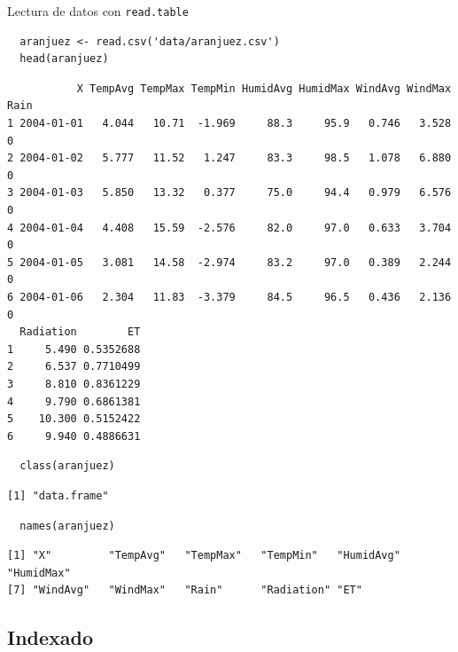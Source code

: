 \documentclass[xcolor={usenames,svgnames,dvipsnames}]{beamer}
\begin{document}
\begin{frame}[fragile,label=sec-5-1-4]{Lectura de datos con \texttt{read.table}}
 \lstset{language=R,label= ,caption= ,numbers=none}
\begin{lstlisting}
  aranjuez <- read.csv('data/aranjuez.csv')
  head(aranjuez)
\end{lstlisting}

\begin{verbatim}
           X TempAvg TempMax TempMin HumidAvg HumidMax WindAvg WindMax Rain
1 2004-01-01   4.044   10.71  -1.969     88.3     95.9   0.746   3.528    0
2 2004-01-02   5.777   11.52   1.247     83.3     98.5   1.078   6.880    0
3 2004-01-03   5.850   13.32   0.377     75.0     94.4   0.979   6.576    0
4 2004-01-04   4.408   15.59  -2.576     82.0     97.0   0.633   3.704    0
5 2004-01-05   3.081   14.58  -2.974     83.2     97.0   0.389   2.244    0
6 2004-01-06   2.304   11.83  -3.379     84.5     96.5   0.436   2.136    0
  Radiation        ET
1     5.490 0.5352688
2     6.537 0.7710499
3     8.810 0.8361229
4     9.790 0.6861381
5    10.300 0.5152422
6     9.940 0.4886631
\end{verbatim}

\lstset{language=R,label= ,caption= ,numbers=none}
\begin{lstlisting}
  class(aranjuez)
\end{lstlisting}

\begin{verbatim}
[1] "data.frame"
\end{verbatim}

\lstset{language=R,label= ,caption= ,numbers=none}
\begin{lstlisting}
  names(aranjuez)
\end{lstlisting}

\begin{verbatim}
[1] "X"         "TempAvg"   "TempMax"   "TempMin"   "HumidAvg"  "HumidMax" 
[7] "WindAvg"   "WindMax"   "Rain"      "Radiation" "ET"
\end{verbatim}
\end{frame}

\subsection{Indexado}
\label{sec-5-2}
\end{document}
